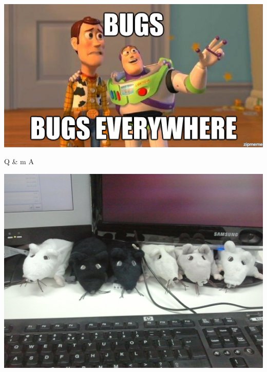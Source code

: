 \documentclass{beamer}
\begin{document}
\begin{frame}
\begin{center}

\includegraphics[scale=0.5]{BUGSBUGSEVERYWHERE.jpg} 

\end{center}

\end{frame}


\begin{frame}
\begin{center}
\Huge{Q \& m A}

\includegraphics[scale=0.1]{../common/questions.jpg} 

\end{center}

\end{frame}
\end{document}

